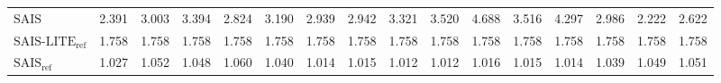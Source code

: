 \begin{table}
{\begin{tabular}{lrrrrrrrrrrrrrrr}
    $\text{SAIS}$ & 2.391 & 3.003 & 3.394 & 2.824 & 3.190 & 2.939 & 2.942 & 3.321 & 3.520 & {\color{red}4.688} & 3.516 & 4.297 & 2.986 & 2.222 & 2.622 \\
    $\text{SAIS-LITE}_{\text{ref}}$ & 1.758 & 1.758 & 1.758 & 1.758 & 1.758 & 1.758 & 1.758 & 1.758 & 1.758 & 1.758 & 1.758 & 1.758 & 1.758 & 1.758 & 1.758 \\
    $\text{SAIS}_{\text{ref}}$ & 1.027 & 1.052 & 1.048 & 1.060 & 1.040 & 1.014 & 1.015 & 1.012 & 1.012 & 1.016 & 1.015 & 1.014 & 1.039 & 1.049 & 1.051 \\
\bottomrule
\end{tabular}
}
\end{table}
